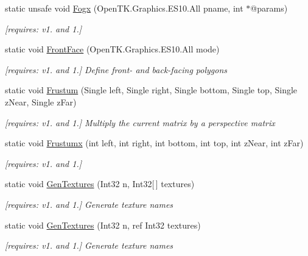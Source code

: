 \begin{DoxyCompactItemize}
static unsafe void \hyperlink{class_open_t_k_1_1_graphics_1_1_e_s10_1_1_g_l_ae583e29626921552e4cc2b427da995cf}{Fogx} (Open\-T\-K.\-Graphics.\-E\-S10.\-All pname, int $\ast$@params)
\begin{DoxyCompactList}\small\item\em \mbox{[}requires\-: v1. and 1.\mbox{]}\end{DoxyCompactList}\item 
static void \hyperlink{class_open_t_k_1_1_graphics_1_1_e_s10_1_1_g_l_ada29d797b3928c5ec2d75445daf1fc90}{Front\-Face} (Open\-T\-K.\-Graphics.\-E\-S10.\-All mode)
\begin{DoxyCompactList}\small\item\em \mbox{[}requires\-: v1. and 1.\mbox{]} Define front-\/ and back-\/facing polygons \end{DoxyCompactList}\item 
static void \hyperlink{class_open_t_k_1_1_graphics_1_1_e_s10_1_1_g_l_a2e5ff2b4f3d05387f52712272c0e6061}{Frustum} (Single left, Single right, Single bottom, Single top, Single z\-Near, Single z\-Far)
\begin{DoxyCompactList}\small\item\em \mbox{[}requires\-: v1. and 1.\mbox{]} Multiply the current matrix by a perspective matrix \end{DoxyCompactList}\item 
static void \hyperlink{class_open_t_k_1_1_graphics_1_1_e_s10_1_1_g_l_ad83d9d65e2dcc2f149fae2eb5d666f88}{Frustumx} (int left, int right, int bottom, int top, int z\-Near, int z\-Far)
\begin{DoxyCompactList}\small\item\em \mbox{[}requires\-: v1. and 1.\mbox{]}\end{DoxyCompactList}\item 
static void \hyperlink{class_open_t_k_1_1_graphics_1_1_e_s10_1_1_g_l_a53e211214354e321dc937adb37e5d7dd}{Gen\-Textures} (Int32 n, Int32\mbox{[}$\,$\mbox{]} textures)
\begin{DoxyCompactList}\small\item\em \mbox{[}requires\-: v1. and 1.\mbox{]} Generate texture names \end{DoxyCompactList}\item 
static void \hyperlink{class_open_t_k_1_1_graphics_1_1_e_s10_1_1_g_l_a991ded181b52fccb7e7e40e2363f1a73}{Gen\-Textures} (Int32 n, ref Int32 textures)
\begin{DoxyCompactList}\small\item\em \mbox{[}requires\-: v1. and 1.\mbox{]} Generate texture names \end{DoxyCompactList}\item 

\end{DoxyCompactItemize}
